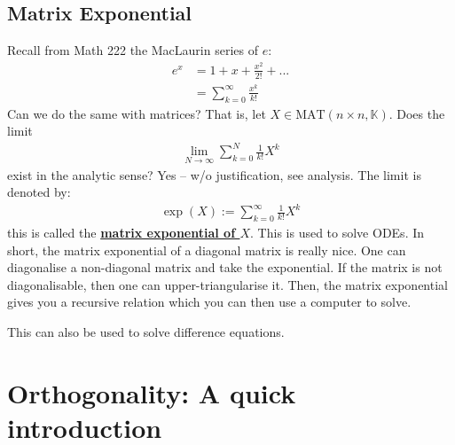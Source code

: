 \documentclass[11pt]{scrartcl}
\theoremstyle{definition}
\theoremstyle{remark}
\newcommand{\dfn}[1]{\textbf{\underline{#1}}}
\newcommand{\matn}[1]{\text{MAT}(n\times n, \mathbb{#1})}
\begin{document}
\subsection{Matrix Exponential}
Recall from Math 222 the MacLaurin series of $e$: 
\begin{align}
	e^x & = 1 + x + \frac{x^2}{2!} + ... \\
	& = \sum_{k=0}^\infty \frac{x^k}{k!}	
\end{align}
Can we do the same with matrices? That is, let $X \in \matn{K}$. Does the limit
\begin{align}
	\lim_{N \rightarrow \infty} \sum_{k=0}^N \frac{1}{k!} X^k	
\end{align}
exist in the analytic sense? Yes -- w/o justification, see analysis. The limit is denoted by: 
\begin{align}
	\operatorname{exp}(X) := \sum_{k=0}^\infty \frac{1}{k!} X^k 	
\end{align}
this is called the \dfn{matrix exponential of $X$}. This is used to solve ODEs. In short, the matrix exponential of a diagonal matrix is really nice. One can diagonalise a non-diagonal matrix and take the exponential. If the matrix is not diagonalisable, then one can upper-triangularise it. Then, the matrix exponential gives you a recursive relation which you can then use a computer to solve. 

This can also be used to solve difference equations. 

\section{Orthogonality: A quick introduction}
\end{document}
